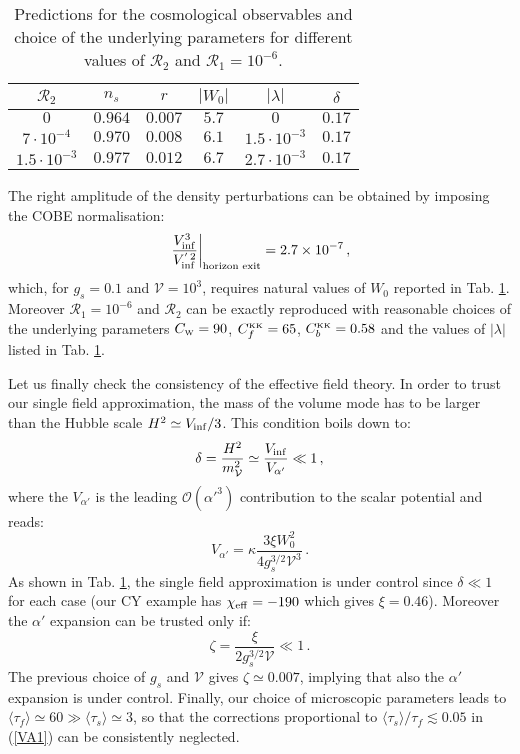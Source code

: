 \documentclass[11pt,a4paper]{article}
\newcommand{\be}{\begin{equation}}
\newcommand{\ee}{\end{equation}}
\def\KK{{\scriptscriptstyle \rm KK}}
\def\W{{\scriptscriptstyle \rm W}}
\newcommand\vo{{\mathcal{V}}}
\newcommand{\mc}{\mathcal}
\begin{document}
\begin{table}[h!]
\begin{center}
\begin{tabular}{cccccc}
\hline
$\mc{R}_2$ & $n_s$ & $r$ & $\left|W_0\right|$ & $|\lambda|$ & $\delta$ \\
\hline
$0$ & $0.964$ & $0.007$ & $5.7$ & $0$ & $0.17$ \\
\hline
$7 \cdot 10^{-4}$ & $0.970$ & $0.008$ & $6.1$ & $1.5 \cdot 10^{-3}$ & $0.17$ \\
\hline
$1.5 \cdot 10^{-3}$ & $0.977$ & $0.012$ & $6.7$ & $2.7 \cdot 10^{-3}$ & $0.17$ \\
\hline
\end{tabular}
\end{center}
\caption{Predictions for the cosmological observables and choice of the underlying parameters for different values of $\mc{R}_2$ and $\mc{R}_1=10^{-6}$.}
\label{tab1}
\end{table}

The right amplitude of the density perturbations can be obtained by imposing the COBE normalisation:
\be
\left.\frac{V_{\rm inf}^3}{V_{\rm inf}^{'\, 2}}\right|_{\text{horizon exit}} = 2.7 \times 10^{-7}\,,
\label{COBE}
\ee
which, for $g_s = 0.1$ and $\vo = 10^3$, requires natural values of $W_0$ reported in Tab. \ref{tab1}. Moreover $\mc{R}_1 = 10^{-6}$ and $\mc{R}_2$ can be exactly reproduced with reasonable choices of the underlying parameters $C_\W = 90$, $C^\KK_f = 65$, $C^\KK_b = 0.58$ and the values of $|\lambda|$ listed in Tab. \ref{tab1}. 

Let us finally check the consistency of the effective field theory. In order to trust our single field approximation, the mass of the volume mode has to be larger than the Hubble scale $H^2 \simeq V_{\rm inf}/3$. This condition boils down to:
\be
\delta = \frac{H^2}{m^2_{\vo}} \simeq \frac{V_{\rm inf}}{V_{\alpha'}} \ll 1\,,
\label{singlefield}
\ee
where the $V_{\alpha'}$ is the leading $\mc{O}(\alpha'^3)$ contribution to the scalar potential and reads:
\be
V_{\alpha'} = \kappa \frac{3 \xi W_0^2}{4 g_s^{3/2} \vo^3}\,.
\ee
As shown in Tab. \ref{tab1}, the single field approximation is under control since $\delta\ll 1$ for each case (our CY example has $\chi_{\rm eff} = -190$ which gives $\xi = 0.46$). Moreover the $\alpha'$ expansion can be trusted only if:
\be
\zeta = \frac{\xi}{2 g_s^{3/2} \vo} \ll 1\,.
\ee
The previous choice of $g_s$ and $\vo$ gives $\zeta \simeq 0.007$, implying that also the $\alpha'$ expansion is under control. Finally, our choice of microscopic parameters leads to $\langle \tau_f \rangle \simeq 60 \gg \langle \tau_s \rangle \simeq 3$, so that the corrections proportional to $\langle \tau_s \rangle/\tau_f\lesssim 0.05$ in (\ref{VA1}) can be consistently neglected.
\end{document}
